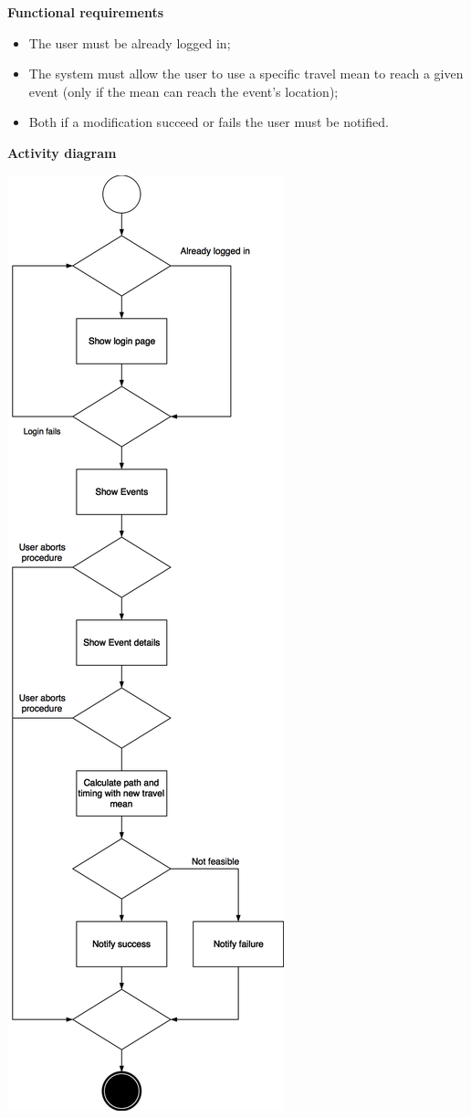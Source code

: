 \documentclass{article}
\begin{document}
	\bigskip
	\noindent
	\textbf{Functional requirements} \\
	\begin{itemize}
		\item The user must be already logged in;
		\item The system must allow the user to use a specific travel mean to reach a given event (only if the mean can reach the event's location);
		\item Both if a modification succeed or fails the user must be notified.
	\end{itemize}
	
	\newpage
	\noindent
	\textbf{Activity diagram} \\
	
	\begin{center}
		\includegraphics[scale=0.24]{img/diagrams/provide_constraints_ad.png} \\ \bigskip

\end{center}
\end{document}
